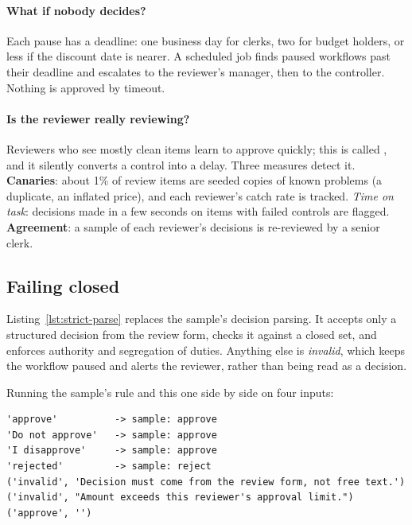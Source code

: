 \paragraph{What if nobody decides?} Each pause has a deadline: one business day for clerks, two for budget holders, or less if the discount date is nearer. A scheduled job finds paused workflows past their deadline and escalates to the reviewer's manager, then to the controller. Nothing is approved by timeout.

\paragraph{Is the reviewer really reviewing?} Reviewers who see mostly clean items learn to approve quickly; this is called , and it silently converts a control into a delay. Three measures detect it. \textbf{Canaries}: about 1\% of review items are seeded copies of known problems (a duplicate, an inflated price), and each reviewer's catch rate is tracked. \emph{Time on task}: decisions made in a few seconds on items with failed controls are flagged. \textbf{Agreement}: a sample of each reviewer's decisions is re-reviewed by a senior clerk.

\subsection{Failing closed}

Listing~\ref{lst:strict-parse} replaces the sample's decision parsing. It accepts only a structured decision from the review form, checks it against a closed set, and enforces authority and segregation of duties. Anything else is \emph{invalid}, which keeps the workflow paused and alerts the reviewer, rather than being read as a decision.



Running the sample's rule and this one side by side on four inputs:

\begin{lstlisting}[language={}, numbers=none, frame=none, xleftmargin=1.5em]
'approve'          -> sample: approve
'Do not approve'   -> sample: approve
'I disapprove'     -> sample: approve
'rejected'         -> sample: reject
('invalid', 'Decision must come from the review form, not free text.')
('invalid', "Amount exceeds this reviewer's approval limit.")
('approve', '')
\end{lstlisting}

